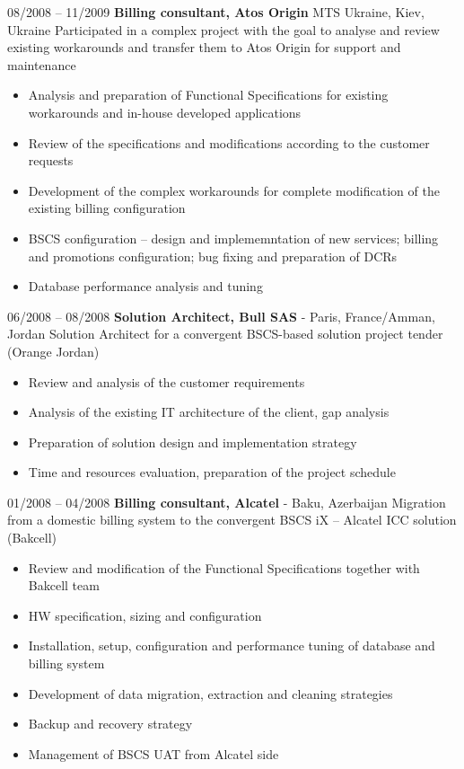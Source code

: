\documentclass[10pt,a4paper]{extbook}
\begin{document}
08/2008 – 11/2009 \hspace{10mm} \textbf{Billing consultant, Atos Origin} \hspace {10mm} MTS Ukraine, Kiev, Ukraine
Participated in a complex project with the goal to analyse and review existing workarounds and transfer them to Atos Origin for support and maintenance
\begin{itemize}
	\item Analysis and preparation of Functional Specifications for existing workarounds and in-house developed applications
	\item Review of the specifications and modifications according to the customer requests
	\item Development of the complex workarounds for complete modification of the existing billing configuration
	\item BSCS configuration – design and implememntation of new services; billing and promotions configuration; bug fixing and preparation of DCRs
	\item Database performance analysis and tuning
\end{itemize}

06/2008 – 08/2008 \hspace{10mm} \textbf{Solution Architect, Bull SAS} \hspace{10mm} - Paris, France/Amman, Jordan
Solution Architect for a convergent BSCS-based solution project tender (Orange Jordan)
\begin{itemize}
	\item Review and analysis of the customer requirements
	\item Analysis of the existing IT architecture of the client, gap analysis
	\item Preparation of solution design and implementation strategy
	\item Time and resources evaluation, preparation of the project schedule
\end{itemize}
	
01/2008 – 04/2008 \hspace{10mm} \textbf{Billing consultant, Alcatel} \hspace{10mm}  - Baku, Azerbaijan
Migration from a domestic billing system to the convergent BSCS iX – Alcatel ICC solution (Bakcell)
\begin{itemize}
	\item Review and modification of the Functional Specifications together with Bakcell team
	\item HW specification, sizing and configuration
	\item Installation, setup, configuration and performance tuning of database and billing system
	\item Development of data migration, extraction and cleaning strategies
	\item Backup and recovery strategy
	\item Management of BSCS UAT from Alcatel side
\end{itemize}
	
\end{document}

